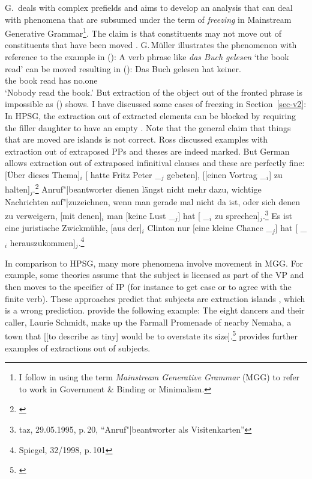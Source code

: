 \begin{exe}
\begin{xlist}
G.\,\citet{GMueller2018a} deals with complex prefields and aims to develop an analysis that can deal
with phenomena that are subsumed under the term of \emph{freezing} in Mainstream
Generative Grammar\footnote{%
  I follow \citet[]{CJ2005a} in using the term \emph{Mainstream Generative Grammar} (MGG) to
  refer to work in Government \& Binding or Minimalism.%
}.
The claim is that constituents may not move out of constituents that have been moved \citep{Ross67a}. G.\,Müller
illustrates the phenomenon with reference to the example in ():
\z
A verb phrase like \emph{das Buch gelesen} `the book read' can be moved resulting in ():
\ea
\gll Das Buch gelesen hat keiner.\\
     the book read    has no.one\\
\glt `Nobody read the book.'
\z
But extraction of the object out of the fronted phrase is impossible as () shows. I have
discussed some cases of freezing in Section~\ref{sec-v2}: In HPSG, the extraction out of extracted elements can be
blocked by requiring the filler daughter to have an empty \slashl. Note that the general claim that
things that are moved are islands is not correct. Ross discussed examples with extraction out of
extraposed PPs and theses are indeed marked. But German allows extraction out of extraposed
infinitival clauses and these are perfectly fine:
\eal
\ex {}[Über dieses Thema]$_i$ [ hatte Fritz Peter \_$_j$ gebeten], [[einen Vortrag \_$_i$]
	zu halten]$_j$.\footnote{
        \citep*[]{HN89b}
}
\ex Anruf"|beantworter dienen längst nicht mehr dazu, wichtige Nachrichten auf"|zuzeichnen, wenn
        man gerade mal nicht da ist, oder sich denen zu verweigern, [mit denen]$_i$ man [keine Lust \_$_j$]
        hat [ \_$_i$ zu sprechen]$_j$.\footnote{
        taz, 29.05.1995, p.\,20, "`Anruf"|beantworter als Visitenkarten"'
        }
\ex Es ist eine juristische Zwickmühle, [aus der]$_i$ Clinton nur [eine kleine Chance \_$_j$]
      hat [ \_$_i$ herauszukommen]$_j$.\footnote{
        Spiegel, 32/1998, p.\,101
      }\label{bsp-chance-hat-herauszukommen}
\zl

In comparison to HPSG, many more
phenomena involve movement in MGG. For example, some theories assume that the subject is licensed as part
of the VP and then moves to the specifier of IP (for instance to get case or to agree with the
finite verb). These approaches predict that subjects are extraction islands \citep[]{Corver2017a-u}, which is a wrong
prediction. \citet[]{HPP2002a-u} provide the following example:
\ea
The eight dancers and their caller, Laurie Schmidt, make up the Farmall Promenade of nearby Nemaha,
a town that [[to describe \trace as tiny] would be to overstate its size].\footnote{%
\citep[]{HPP2002a-u}
}
\z
\citet{Chaves2013a-u} provides further examples of extractions out of subjects. 



\end{xlist}
\end{exe}
